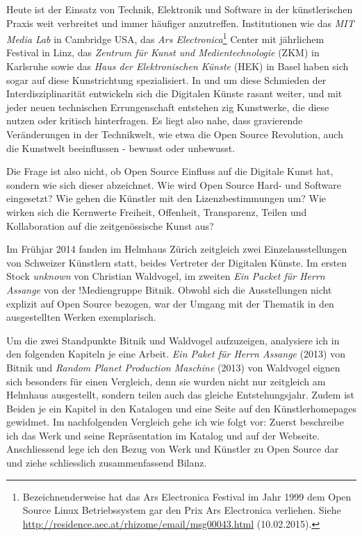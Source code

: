 \documentclass[
paper=164mm:234mm, %
pagesize, %
DIV=calc, %
10pt, %
parskip=half- %
]{scrbook}
\begin{document}
Heute ist der Einsatz von Technik, Elektronik und Software in der künstlerischen Praxis weit verbreitet und immer häufiger anzutreffen. Institutionen wie das \emph{MIT Media Lab} in Cambridge USA, das \emph{Ars Electronica}\footnote{Bezeichnenderweise hat das Ars Electronica Festival im Jahr 1999 dem Open Source Linux Betriebssystem gar den Prix Ars Electronica verliehen. Siehe \url{http://residence.aec.at/rhizome/email/msg00043.html} (10.02.2015).} Center mit jährlichem Festival in Linz, das \emph{Zentrum für Kunst und Medientechnologie} (ZKM) in Karlsruhe sowie das \emph{Haus der Elektronischen Künste} (HEK) in Basel haben sich sogar auf diese Kunstrichtung spezialisiert. In und um diese Schmieden der Interdisziplinarität entwickeln sich die Digitalen Künste rasant weiter, und mit jeder neuen technischen Errungenschaft entstehen zig Kunstwerke, die diese nutzen oder kritisch hinterfragen. Es liegt also nahe, dass gravierende Veränderungen in der Technikwelt, wie etwa die Open Source Revolution, auch die Kunstwelt beeinflussen - bewusst oder unbewusst.

Die Frage ist also nicht, ob Open Source Einfluss auf die Digitale Kunst hat, sondern wie sich dieser abzeichnet. Wie wird Open Source Hard- und Software eingesetzt? Wie gehen die Künstler mit den Lizenzbestimmungen um? Wie wirken sich die Kernwerte Freiheit, Offenheit, Transparenz, Teilen und Kollaboration auf die zeitgenössische Kunst aus?

Im Frühjar 2014 fanden im Helmhaus Zürich zeitgleich zwei Einzelausstellungen von Schweizer Künstlern statt, beides Vertreter der Digitalen Künste. Im ersten Stock \emph{unknown} von Christian Waldvogel, im zweiten \emph{Ein Packet für Herrn Assange} von der !Mediengruppe Bitnik. Obwohl sich die Ausstellungen nicht explizit auf Open Source bezogen, war der Umgang mit der Thematik in den ausgestellten Werken exemplarisch.

Um die zwei Standpunkte Bitnik und Waldvogel aufzuzeigen, analysiere ich in den folgenden Kapiteln je eine Arbeit. \emph{Ein Paket für Herrn Assange} (2013) von Bitnik und \emph{Random Planet Production Maschine} (2013) von Waldvogel eignen sich besonders für einen Vergleich, denn sie wurden nicht nur zeitgleich am Helmhaus ausgestellt, sondern teilen auch das gleiche Entstehungsjahr. Zudem ist Beiden je ein Kapitel in den Katalogen und eine Seite auf den Künstlerhomepages gewidmet. Im nachfolgenden Vergleich gehe ich wie folgt vor: Zuerst beschreibe ich das Werk und seine Repräsentation im Katalog und auf der Webseite. Anschliessend lege ich den Bezug von Werk und Künstler zu Open Source dar und ziehe schliesslich zusammenfassend Bilanz.
\end{document}
